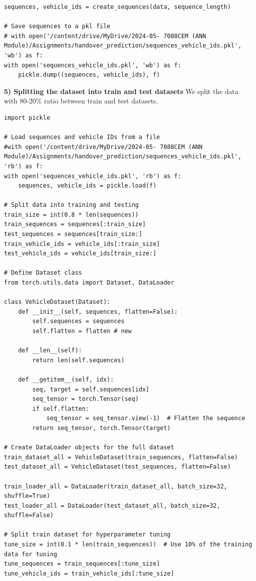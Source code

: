 \documentclass[journal,onecolumn]{IEEEtran}
\begin{document}
{\begin{appendices}
\begin{verbatim}
sequences, vehicle_ids = create_sequences(data, sequence_length)

# Save sequences to a pkl file
# with open('/content/drive/MyDrive/2024-05- 7088CEM (ANN Module)/Assignments/handover_prediction/sequences_vehicle_ids.pkl', 'wb') as f:
with open('sequences_vehicle_ids.pkl', 'wb') as f:
    pickle.dump((sequences, vehicle_ids), f)
\end{verbatim}

\textbf{5) Splitting the dataset into train and test datasets}
We split the data with 80-20\% ratio between train and test datasets.
\begin{verbatim}
import pickle

# Load sequences and vehicle IDs from a file
#with open('/content/drive/MyDrive/2024-05- 7088CEM (ANN Module)/Assignments/handover_prediction/sequences_vehicle_ids.pkl', 'rb') as f:
with open('sequences_vehicle_ids.pkl', 'rb') as f:
    sequences, vehicle_ids = pickle.load(f)

# Split data into training and testing
train_size = int(0.8 * len(sequences))
train_sequences = sequences[:train_size]
test_sequences = sequences[train_size:]
train_vehicle_ids = vehicle_ids[:train_size]
test_vehicle_ids = vehicle_ids[train_size:]

# Define Dataset class
from torch.utils.data import Dataset, DataLoader

class VehicleDataset(Dataset):
    def __init__(self, sequences, flatten=False):
        self.sequences = sequences
        self.flatten = flatten # new

    def __len__(self):
        return len(self.sequences)

    def __getitem__(self, idx):
        seq, target = self.sequences[idx]
        seq_tensor = torch.Tensor(seq)
        if self.flatten:
            seq_tensor = seq_tensor.view(-1)  # Flatten the sequence
        return seq_tensor, torch.Tensor(target)

# Create DataLoader objects for the full dataset
train_dataset_all = VehicleDataset(train_sequences, flatten=False)
test_dataset_all = VehicleDataset(test_sequences, flatten=False)

train_loader_all = DataLoader(train_dataset_all, batch_size=32, shuffle=True)
test_loader_all = DataLoader(test_dataset_all, batch_size=32, shuffle=False)

# Split train dataset for hyperparameter tuning
tune_size = int(0.1 * len(train_sequences))  # Use 10% of the training data for tuning
tune_sequences = train_sequences[:tune_size]
tune_vehicle_ids = train_vehicle_ids[:tune_size]


\end{verbatim}
\end{appendices}}
\end{document}
